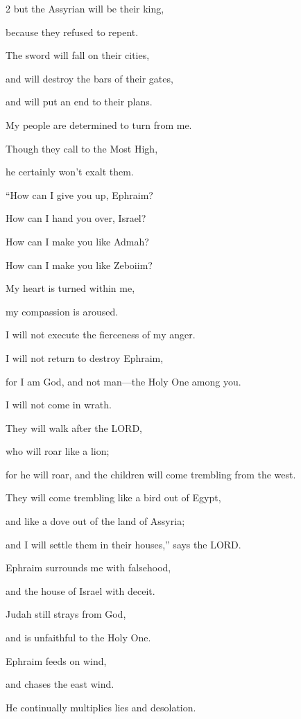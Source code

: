 \begin{multicols}{2}
but the Assyrian will be their king,

because they refused to repent.

\myverse{}The sword will fall on their cities,

and will destroy the bars of their gates,

and will put an end to their plans.

\myverse{}My people are determined to turn from me.

Though they call to the Most High,

he certainly won’t exalt them.


\vspace{\baselineskip} \myverse{}“How can I give you up, Ephraim?

How can I hand you over, Israel?

How can I make you like Admah?

How can I make you like Zeboiim?

My heart is turned within me,

my compassion is aroused.

\myverse{}I will not execute the fierceness of my anger.

I will not return to destroy Ephraim,

for I am God, and not man—the Holy One among you.

I will not come in wrath.

\myverse{}They will walk after the LORD,

who will roar like a lion;

for he will roar, and the children will come trembling from the west.

\myverse{}They will come trembling like a bird out of Egypt,

and like a dove out of the land of Assyria;

and I will settle them in their houses,” says the LORD.


\vspace{\baselineskip} \myverse{}Ephraim surrounds me with falsehood,

and the house of Israel with deceit.

Judah still strays from God,

and is unfaithful to the Holy One.


\mychapter{} \myverse*{}Ephraim feeds on wind,

\quad\quad and chases the east wind.

He continually multiplies lies and desolation.


\end{multicols}
